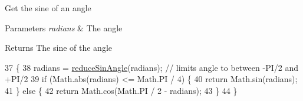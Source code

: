Get the sine of an angle


\begin{DoxyParams}{Parameters}
{\em radians} & The angle \\
\hline
\end{DoxyParams}
\begin{DoxyReturn}{Returns}
The sine of the angle 
\end{DoxyReturn}

\begin{DoxyCode}
37                                              \{
38         radians = \mbox{\hyperlink{classorg_1_1newdawn_1_1slick_1_1util_1_1_fast_trig_a91525588388e9e09ba6694764a77545b}{reduceSinAngle}}(radians); \textcolor{comment}{// limits angle to between -PI/2 and +PI/2}
39         \textcolor{keywordflow}{if} (Math.abs(radians) <= Math.PI / 4) \{
40             \textcolor{keywordflow}{return} Math.sin(radians);
41         \} \textcolor{keywordflow}{else} \{
42             \textcolor{keywordflow}{return} Math.cos(Math.PI / 2 - radians);
43         \}
44     \}
\end{DoxyCode}
